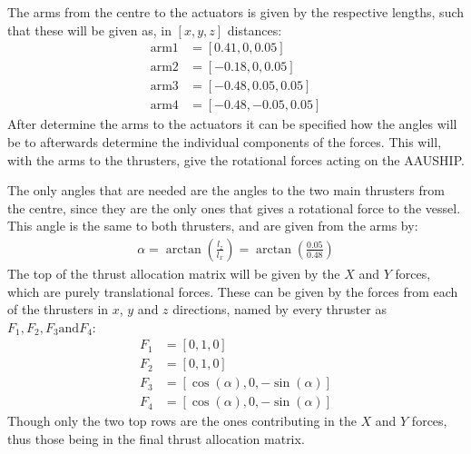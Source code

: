 The arms from the centre to the actuators is given by the respective lengths, such that these will be given as, in $[x, y, z]$ distances:
\begin{align}
\text{arm1} &= [0.41, 0, 0.05]\\
\text{arm2} &= [-0.18, 0, 0.05]\\
\text{arm3} &= [-0.48, 0.05, 0.05]\\
\text{arm4} &= [-0.48, -0.05, 0.05]
\end{align}
After determine the arms to the actuators it can be specified how the angles will be to afterwards determine the individual components of the forces. This will, with the arms to the thrusters, give the rotational forces acting on the AAUSHIP.

The only angles that are needed are the angles to the two main thrusters from the centre, since they are the only ones that gives a rotational force to the vessel. This angle is the same to both thrusters, and are given from the arms by:
\begin{align}
\alpha = \arctan\left(\frac{l_z}{l_x}\right) = \arctan\left(\frac{0.05}{0.48}\right)
\end{align}
The top of the thrust allocation matrix will be given by the $X$ and $Y$ forces, which are purely translational forces. These can be given by the forces from each of the thrusters in $x$, $y$ and $z$ directions, named by every thruster as $F_1, F_2, F_3 \text{and} F_4$:
\begin{align}
F_1 &= [0, 1, 0] \\
F_2 &= [0, 1, 0] \\
F_3 &= [\cos(\alpha), 0, -\sin(\alpha)] \\
F_4 &= [\cos(\alpha), 0, -\sin(\alpha)] 
\end{align}
Though only the two top rows are the ones contributing in the $X$ and $Y$ forces, thus those being in the final thrust allocation matrix.

